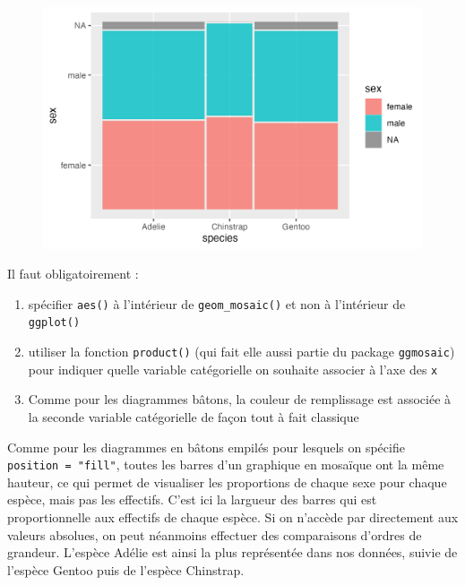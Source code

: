 \documentclass[
  letterpaper,
  DIV=11,
  numbers=noendperiod]{scrreprt}
\providecommand{\tightlist}{%
  \setlength{\itemsep}{0pt}\setlength{\parskip}{0pt}}\usepackage{longtable,booktabs,array}
\begin{document}
\begin{figure}[H]

{\centering \includegraphics{./03-visualization_files/figure-pdf/unnamed-chunk-67-1.png}

}

\end{figure}

Il faut obligatoirement :

\begin{enumerate}
\def\labelenumi{\arabic{enumi}.}
\tightlist
\item
  spécifier \texttt{aes()} à l'intérieur de \texttt{geom\_mosaic()} et
  non à l'intérieur de \texttt{ggplot()}
\item
  utiliser la fonction \texttt{product()} (qui fait elle aussi partie du
  package \texttt{ggmosaic}) pour indiquer quelle variable catégorielle
  on souhaite associer à l'axe des \texttt{x}
\item
  Comme pour les diagrammes bâtons, la couleur de remplissage est
  associée à la seconde variable catégorielle de façon tout à fait
  classique
\end{enumerate}

Comme pour les diagrammes en bâtons empilés pour lesquels on spécifie
\texttt{position\ =\ "fill"}, toutes les barres d'un graphique en
mosaïque ont la même hauteur, ce qui permet de visualiser les
proportions de chaque sexe pour chaque espèce, mais pas les effectifs.
C'est ici la largueur des barres qui est proportionnelle aux effectifs
de chaque espèce. Si on n'accède par directement aux valeurs absolues,
on peut néanmoins effectuer des comparaisons d'ordres de grandeur.
L'espèce Adélie est ainsi la plus représentée dans nos données, suivie
de l'espèce Gentoo puis de l'espèce Chinstrap.
\end{document}

